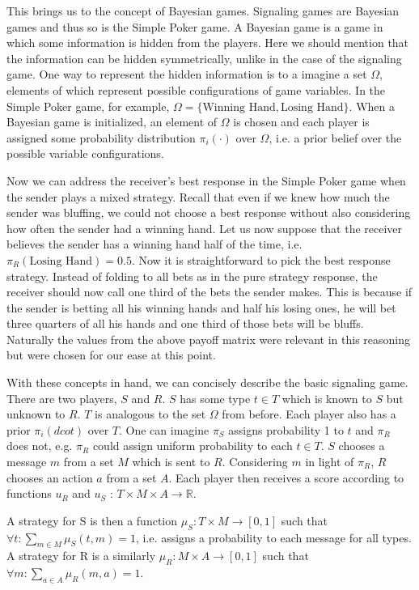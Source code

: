 \documentclass{article}
\begin{document}
This brings us to the concept of Bayesian games. Signaling games are Bayesian games and thus so is the Simple Poker game. A Bayesian game is a game in which some information is hidden from the players. Here we should mention that the information can be hidden symmetrically, unlike in the case of the signaling game. One way to represent the hidden information is to a imagine a set $\Omega$, elements of which represent possible configurations of game variables. In the Simple Poker game, for example, $\Omega = \{\text{Winning Hand}, \text{Losing Hand}\}$. When a Bayesian game is initialized, an element of $\Omega$ is chosen and each player is assigned some probability distribution $\pi_{i}(\cdot)$ over $\Omega$, i.e. a prior belief over the possible variable configurations.

Now we can address the receiver's best response in the Simple Poker game when the sender plays a mixed strategy. Recall that even if we knew how much the sender was bluffing, we could not choose a best response without also considering how often the sender had a winning hand. Let us now suppose that the receiver believes the sender has a winning hand half of the time, i.e. $\pi_R(\text{Losing Hand}) = 0.5$. Now it is straightforward to pick the best response strategy. Instead of folding to all bets as in the pure strategy response, the receiver should now call one third of the bets the sender makes. This is because if the sender is betting all his winning hands and half his losing ones, he will bet three quarters of all his hands and one third of those bets will be bluffs. Naturally the values from the above payoff matrix were relevant in this reasoning but were chosen for our ease at this point.

With these concepts in hand, we can concisely describe the basic signaling game. There are two players, $S$ and $R$. $S$ has some type $t \in T$ which is known to $S$ but unknown to $R$. $T$ is analogous to the set $\Omega$ from before. Each player also has a prior $ \pi_i(dcot)$ over $T$. One can imagine $\pi_{S}$ assigns probability 1 to $t$ and $\pi_{R}$ does not, e.g. $\pi_{R}$ could assign uniform probability to each $t \in T$. $S$ chooses a message $m$ from a set $M$ which is sent to $R$. Considering $m$ in light of $\pi_R$, $R$ chooses an action $a$ from a set $A$. Each player then receives a score according to functions $u_R$ and $u_S$ : $T \times M \times A \to \mathbb{R}$.

A strategy for S is then a function $\mu_{S}: T \times M \to [0,1]$ such that $\forall t: \sum_{m \in M} \mu_{S}(t, m) = 1$, i.e. assigns a probability to each message for all types. A strategy for R is a similarly $\mu_{R} : M \times A \to [0,1]$ such that $\forall m: \sum_{a \in A} \mu_{R}(m,a) = 1$.
\end{document}

